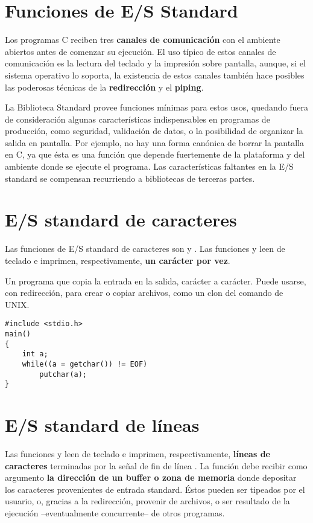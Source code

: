 \section{Funciones de E/S Standard}
\label{sec:esstandard}
Los programas C reciben tres \textbf{canales de comunicación} con el ambiente abiertos
antes de comenzar su ejecución. El uso típico de estos canales de comunicación
es la lectura del teclado y la impresión sobre pantalla, aunque, si el sistema
operativo lo soporta, la existencia de estos canales también hace posibles las poderosas técnicas de la
\textbf{redirección} y el \textbf{piping}. 


La Biblioteca Standard provee funciones mínimas para estos usos,
quedando fuera de consideración algunas características indispensables en
programas de producción, como seguridad, validación de datos, o la posibilidad de
organizar la salida en pantalla. Por ejemplo, no hay una forma canónica de
borrar la pantalla en C, ya que ésta es una función que depende fuertemente de
la plataforma y del ambiente donde se ejecute el programa. Las características faltantes en la
E/S standard se compensan recurriendo a bibliotecas de terceras partes.

\section{E/S standard de caracteres}
\label{subsec:esstandardcaract}
Las funciones de E/S standard de caracteres son  y . Las funciones  y  leen de teclado e imprimen, respectivamente, \textbf{un carácter por vez}.

\begin{ejemplo}
Un programa que copia la entrada en la salida, carácter a
carácter. Puede usarse, con redirección, para crear o copiar archivos, como un
clon del comando  de UNIX.

\begin{lstlisting}
#include <stdio.h>
main()
{
    int a;
    while((a = getchar()) != EOF)
        putchar(a);
}
\end{lstlisting}
\end{ejemplo}

\section{E/S standard de líneas}
\label{subsec:esstandardlineas}
Las funciones  y  leen de teclado e imprimen, respectivamente,
\textbf{líneas de caracteres} terminadas por la señal de fin de línea \code{\n}. La función
 debe recibir como argumento \textbf{la dirección de un buffer o zona de memoria}
donde depositar los caracteres provenientes de entrada standard. Éstos pueden ser tipeados por 
el usuario, o, gracias a la redirección, provenir de archivos, o ser
resultado de la ejecución --eventualmente concurrente-- de otros programas. 

